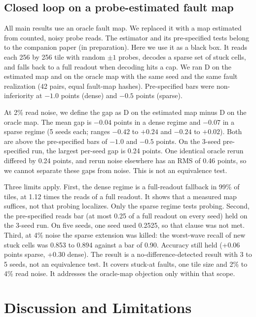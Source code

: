 \documentclass[journal]{IEEEtran}
\begin{document}
\subsection{Closed loop on a probe-estimated fault map}
\label{sec:closedloop}
All main results use an oracle fault map.
We replaced it with a map estimated from counted, noisy probe reads.
The estimator and its pre-specified tests belong to the companion paper (in preparation).
Here we use it as a black box.
It reads each 256 by 256 tile with random $\pm 1$ probes, decodes a sparse set of stuck cells, and falls back to a full readout when decoding hits a cap.
We ran D on the estimated map and on the oracle map with the same seed and the same fault realization (42 pairs, equal fault-map hashes).
Pre-specified bars were non-inferiority at $-1.0$ points (dense) and $-0.5$ points (sparse).

At 2\% read noise, we define the gap as D on the estimated map minus D on the oracle map.
The mean gap is $-0.04$ points in a dense regime and $-0.07$ in a sparse regime (5 seeds each; ranges $-0.42$ to $+0.24$ and $-0.24$ to $+0.02$).
Both are above the pre-specified bars of $-1.0$ and $-0.5$ points.
On the 3-seed pre-specified run, the largest per-seed gap is 0.24 points.
One identical oracle rerun differed by 0.24 points, and rerun noise elsewhere has an RMS of 0.46 points, so we cannot separate these gaps from noise.
This is not an equivalence test.

Three limits apply.
First, the dense regime is a full-readout fallback in 99\% of tiles, at 1.12 times the reads of a full readout.
It shows that a measured map suffices, not that probing localizes.
Only the sparse regime tests probing.
Second, the pre-specified reads bar (at most 0.25 of a full readout on every seed) held on the 3-seed run.
On five seeds, one seed used 0.2525, so that clause was not met.
Third, at 4\% noise the sparse extension was killed: the worst-wave recall of new stuck cells was 0.853 to 0.894 against a bar of 0.90.
Accuracy still held (+0.06 points sparse, +0.30 dense).
The result is a no-difference-detected result with 3 to 5 seeds, not an equivalence test.
It covers stuck-at faults, one tile size and 2\% to 4\% read noise.
It addresses the oracle-map objection only within that scope.

\section{Discussion and Limitations}
\label{sec:discussion}
\end{document}
